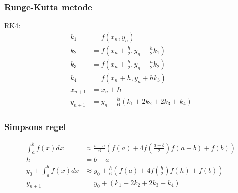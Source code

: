 \begin{frame}
\frametitle{Runge-Kutta metode}
RK4:\\
\begin{align*}
k_1&=f(x_n,y_n)\\
k_2&=f(x_n+\frac{h}{2},y_n+\frac{h}{2}k_1)\\
k_3&=f(x_n+\frac{h}{2},y_n+\frac{h}{2}k_2)\\
k_4&=f(x_n+h,y_n+h k_3)\\
x_{n+1}&=x_n+h\\
y_{n+1}&=y_n+\frac{h}{6}(k_1+2k_2+2k_3+k_4)
\end{align*}
\end{frame}

\begin{frame}
\frametitle{Simpsons regel}
\begin{align*}
\int_a^bf(x)dx &\approx \frac{b-a}{6} \left( f(a)+4f \left( \frac{a+b}{2} \right) f(a+b)+f(b) \right)\\
h&=b-a\\
y_0+\int_a^bf(x)dx &\approx y_0+ \frac{h}{6} \left( f(a)+4f \left( \frac{h}{2} \right) f(h)+f(b) \right)\\
y_{n+1}&=y_0+(k_1+2k_2+2k_3+k_4)
\end{align*}
\end{frame}


